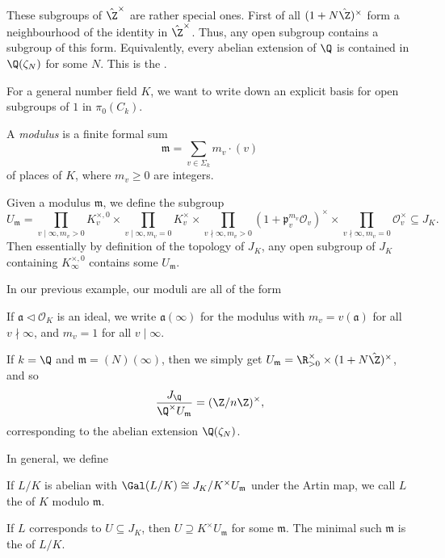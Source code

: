 \documentclass[a4paper]{article}
\begin{document}
These subgroups of $\hat{\Z}^\times$ are rather special ones. First of all $(1 + N \hat{\Z})^\times$ form a neighbourhood of the identity in $\hat{\Z}^\times$. Thus, any open subgroup contains a subgroup of this form. Equivalently, every abelian extension of $\Q$ is contained in $\Q(\zeta_N)$ for some $N$. This is the .

For a general number field $K$, we want to write down an explicit basis for open subgroups of $1$ in $\pi_0(C_k)$.
\begin{defi}[Modulus]
  A \emph{modulus} is a finite formal sum
  \[
    \mathfrak{m} = \sum_{v \in \Sigma_k} m_v \cdot (v)
  \]
  of places of $K$, where $m_v \geq 0$ are integers.
\end{defi}

Given a modulus $\mathfrak{m}$, we define the subgroup
\[
  U_\mathfrak{m} = \prod_{v \mid \infty, m_v > 0}\!\! K_v^{\times, 0} \times \prod_{v \mid \infty, m_v = 0} \!\!K_v^\times \times \prod_{v \nmid \infty, m_v > 0} (1 + \mathfrak{p}_v^{m_v} \mathcal{O}_v)^{\times} \times \prod_{v \nmid \infty, m_v = 0} \mathcal{O}_v^\times \subseteq J_K.
\]
Then essentially by definition of the topology of $J_K$, any open subgroup of $J_K$ containing $K_\infty^{\times, 0}$ contains some $U_\mathfrak{m}$.

In our previous example, our moduli are all of the form
\begin{defi}
  If $\mathfrak{a} \lhd \mathcal{O}_K$ is an ideal, we write $\mathfrak{a}(\infty)$ for the modulus with $m_v = v(\mathfrak{a})$ for all $v \nmid \infty$, and $m_v = 1$ for all $v \mid \infty$.
\end{defi}

If $k = \Q$ and $\mathfrak{m} = (N)(\infty)$, then we simply get $U_\mathfrak{m} = \R_{>0}^\times \times (1 + N \hat{\Z})^\times$, and so
\[
  \frac{J_\Q}{\Q^\times U_\mathfrak{m}} = (\Z/n\Z)^\times,
\]
corresponding to the abelian extension $\Q(\zeta_N)$.

In general, we define
\begin{defi}
  If $L/K$ is abelian with $\Gal(L/K) \cong J_K/K^\times U_\mathfrak{m}$ under the Artin map, we call $L$ the  of $K$ modulo $\mathfrak{m}$.
\end{defi}

\begin{defi}[Conductor]
  If $L$ corresponds to $U \subseteq J_K$, then $U \supseteq K^\times U_\mathfrak{m}$ for some $\mathfrak{m}$. The minimal such $\mathfrak{m}$ is the  of $L/K$.
\end{defi}
\end{document}

